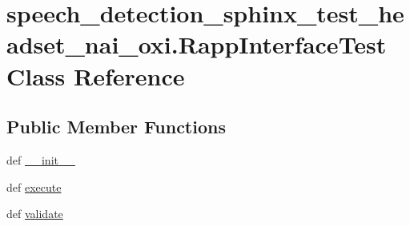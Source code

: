 \hypertarget{classspeech__detection__sphinx__test__headset__nai__oxi_1_1RappInterfaceTest}{\section{speech\-\_\-detection\-\_\-sphinx\-\_\-test\-\_\-headset\-\_\-nai\-\_\-oxi.\-Rapp\-Interface\-Test Class Reference}
\label{classspeech__detection__sphinx__test__headset__nai__oxi_1_1RappInterfaceTest}
}
\subsection*{Public Member Functions}
\begin{DoxyCompactItemize}
\item 
def \hyperlink{classspeech__detection__sphinx__test__headset__nai__oxi_1_1RappInterfaceTest_a84f8e85ea130e09fccae13c7a7a4444c}{\-\_\-\-\_\-init\-\_\-\-\_\-}
\item 
def \hyperlink{classspeech__detection__sphinx__test__headset__nai__oxi_1_1RappInterfaceTest_a8cec76bdb831b22c3d2ddcadfa719d84}{execute}
\item 
def \hyperlink{classspeech__detection__sphinx__test__headset__nai__oxi_1_1RappInterfaceTest_ac705786f30f9672aec652c8370d99f46}{validate}
\end{DoxyCompactItemize}
